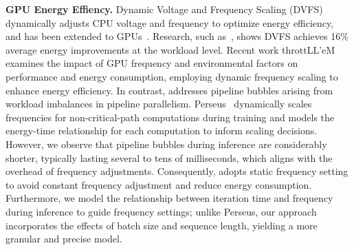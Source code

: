 \noindent
\textbf{GPU Energy Effiency.}
Dynamic Voltage and Frequency Scaling (DVFS) dynamically adjusts CPU voltage and frequency to optimize energy efficiency, and has been extended to GPUs~\cite{mei2013measurement, tang2019impact, kakolyris2024slo, jia2024pccl}.
Research, such as~\cite{guerreiro2019dvfs}, shows DVFS achieves 16\% average energy improvements at the workload level.
Recent work throttLL’eM~\cite{kakolyris2025throttll} examines the impact of GPU frequency and environmental factors on performance and energy consumption, employing dynamic frequency scaling to enhance energy efficiency.
In contrast, \thisproj{} addresses pipeline bubbles arising from workload imbalances in pipeline parallelism.
Perseus~\cite{chung2024reducing} dynamically scales frequencies for non-critical-path computations during training and models the energy-time relationship for each computation to inform scaling decisions.
However, we observe that pipeline bubbles during inference are considerably shorter, typically lasting several to tens of milliseconds, which aligns with the overhead of frequency adjustments.
Consequently, \thisproj{} adopts static frequency setting to avoid constant frequency adjustment and reduce energy consumption.
Furthermore, we model the relationship between iteration time and frequency during inference to guide frequency settings; unlike Perseus, our approach incorporates the effects of batch size and sequence length, yielding a more granular and precise model.







